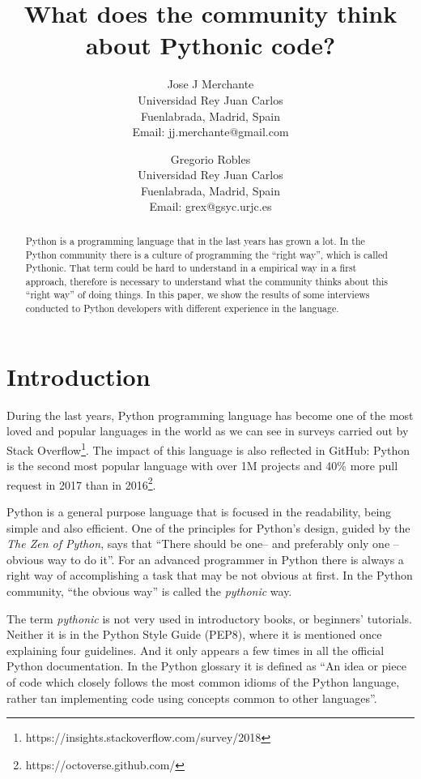 \documentclass[a4paper]{article}
\title{What does the community think about Pythonic code?}
\author{
Jose J Merchante \\ 
Universidad Rey Juan Carlos\\
Fuenlabrada, Madrid, Spain\\
Email: jj.merchante@gmail.com
\and
Gregorio Robles \\
Universidad Rey Juan Carlos\\
Fuenlabrada, Madrid, Spain\\
Email: grex@gsyc.urjc.es
}
\begin{document}
\maketitle

\begin{abstract}
Python is a programming language that in the last years has grown a lot. In the Python community there is a culture of programming the ``right way'', which is called Pythonic. That term could be hard to understand in a empirical way in a first approach, therefore is necessary to understand what the community thinks about this ``right way'' of doing things. In this paper, we show the results of some interviews conducted to Python developers with different experience in the language.

\end{abstract}


\section{Introduction}

During the last years, Python programming language has become one of the most loved and popular languages in the world as we can see in surveys carried out by Stack Overflow\footnote{https://insights.stackoverflow.com/survey/2018}. The impact of this language is also reflected in GitHub: Python is the second most popular language with over 1M projects and 40\% more pull request in 2017 than in 2016\footnote{https://octoverse.github.com/}. 

Python is a general purpose language that is focused in the readability, being simple and also efficient. One of the principles for Python's design, guided by the \textit{The Zen of Python}, says that ``There should be one-- and preferably only one --obvious way to do it''. For an advanced programmer in Python there is always a right way of accomplishing a task that may be not obvious at first. In the Python community, ``the obvious way'' is called the \emph{pythonic} way.

The term \textit{pythonic} is not very used in introductory books, or beginners' tutorials. Neither it is in the Python Style Guide (PEP8), where it is mentioned once explaining four guidelines.  And it only appears a few times in all the official Python documentation. In the Python glossary it is defined as ``An idea or piece of code which closely follows the most common idioms of the Python language, rather tan implementing code using concepts common to other languages''.
\end{document}
